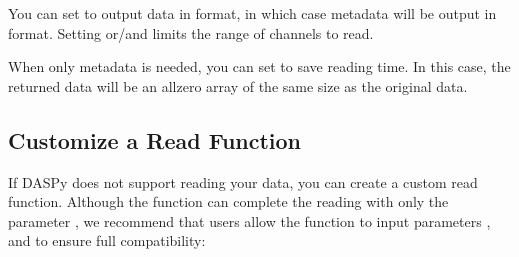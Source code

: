 \documentclass[letterpaper,10pt,english]{sphinxmanual}
\begin{document}
\begin{sphinxVerbatim}[commandchars=\\\{\}]
   
   
\end{sphinxVerbatim}

\sphinxAtStartPar
You can set  to output data in  format, in which case metadata will be output in  format. Setting  or/and  limits the range of channels to read.

\begin{sphinxVerbatim}[commandchars=\\\{\}]
      
\end{sphinxVerbatim}

\sphinxAtStartPar
When only metadata is needed, you can set  to save reading time. In this case, the returned data will be an all\sphinxhyphen{}zero array of the same size as the original data.


\subsection{Customize a Read Function}
\label{\detokenize{Reading DAS Data:customize-a-read-function}}
\sphinxAtStartPar
If DASPy does not support reading your data, you can create a custom read function. Although the function can complete the reading with only the parameter  , we recommend that users allow the function to input parameters ,  and  to ensure full compatibility:
\end{document}
